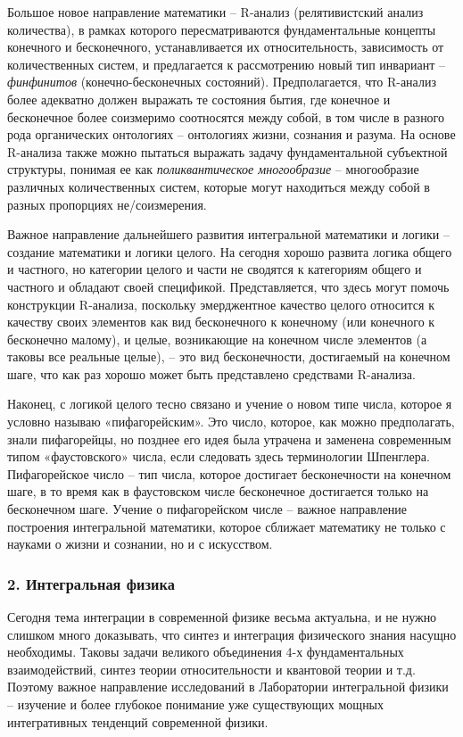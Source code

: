     Большое новое направление математики – R-анализ (релятивистский анализ количества), в рамках которого пересматриваются фундаментальные концепты конечного и бесконечного, устанавливается их относительность, зависимость от количественных систем, и предлагается к рассмотрению новый тип инвариант – \textit{финфинитов} (конечно-бесконечных состояний). Предполагается, что R-анализ более адекватно должен выражать те состояния бытия, где конечное и бесконечное более соизмеримо соотносятся между собой, в том числе в разного рода органических онтологиях – онтологиях жизни, сознания и разума. На основе R-анализа также можно пытаться выражать задачу фундаментальной субъектной структуры, понимая ее как \textit{поликвантическое многообразие} – многообразие различных количественных систем, которые могут находиться между собой в разных пропорциях не/соизмерения.

    Важное направление дальнейшего развития интегральной математики и логики – создание математики и логики целого. На сегодня хорошо развита логика общего и частного, но категории целого и части не сводятся к категориям общего и частного и обладают своей спецификой. Представляется, что здесь могут помочь конструкции R-анализа, поскольку эмерджентное качество целого относится к качеству своих элементов как вид бесконечного к конечному (или конечного к бесконечно малому), и целые, возникающие на конечном числе элементов (а таковы все реальные целые), – это вид бесконечности, достигаемый на конечном шаге, что как раз хорошо может быть представлено средствами R-анализа.

    Наконец, с логикой целого тесно связано и учение о новом типе числа, которое я условно называю «пифагорейским». Это число, которое, как можно предполагать, знали пифагорейцы, но позднее его идея была утрачена и заменена современным типом «фаустовского» числа, если следовать здесь терминологии Шпенглера. Пифагорейское число – тип числа, которое достигает бесконечности на конечном шаге, в то время как в фаустовском числе бесконечное достигается только на бесконечном шаге. Учение о пифагорейском числе – важное направление построения интегральной математики, которое сближает математику не только с науками о жизни и сознании, но и с искусством.

    \subsubsection*{2. Интегральная физика}
    Сегодня тема интеграции в современной физике весьма актуальна, и не нужно слишком много доказывать, что синтез и интеграция физического знания насущно необходимы. Таковы задачи великого объединения 4-х фундаментальных взаимодействий, синтез теории относительности и квантовой теории и т.д. Поэтому важное направление исследований в Лаборатории интегральной физики – изучение и более глубокое понимание уже существующих мощных интегративных тенденций современной физики.

